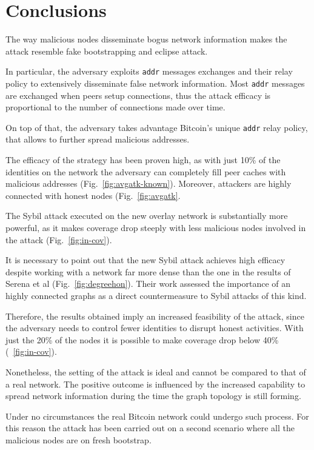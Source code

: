 \chapter{Conclusions}
\label{sec:concl}
The way malicious nodes disseminate bogus network information makes the attack resemble fake bootstrapping and eclipse attack.

In particular, the adversary exploits \texttt{addr} messages exchanges and their relay policy to extensively disseminate false network information. Most \texttt{addr} messages are exchanged when peers setup connections, thus the attack efficacy is proportional to the number of connections made over time.

On top of that, the adversary takes advantage Bitcoin's unique \texttt{addr} relay policy, that allows to further spread malicious addresses.

The efficacy of the strategy has been proven high, as with just 10\% of the identities on the network the adversary can completely fill peer caches with malicious addresses (Fig.~\ref{fig:avgatk-known}). Moreover, attackers are highly connected with honest nodes (Fig.~\ref{fig:avgatk}.

The Sybil attack executed on the new overlay network is substantially more powerful, as it makes coverage drop steeply with less malicious nodes involved in the attack (Fig.~\ref{fig:in-cov}).

It is necessary to point out that the new Sybil attack achieves high efficacy despite working with a network far more dense than the one in the results of Serena et al (Fig.~\ref{fig:degreehon}). Their work assessed the importance of an highly connected graphs as a direct countermeasure to Sybil attacks of this kind.

Therefore, the results obtained imply an increased feasibility of the attack, since the adversary needs to control fewer identities to disrupt honest activities. With just the 20\% of the nodes it is possible to make coverage drop below 40\% (~\ref{fig:in-cov}).\par

Nonetheless, the setting of the attack is ideal and cannot be compared to that of a real network. The positive outcome is influenced by the increased capability to spread network information during the time the graph topology is still forming.

Under no circumstances the real Bitcoin network could undergo such process. For this reason the attack has been carried out on a second scenario where all the malicious nodes are on fresh bootstrap.


